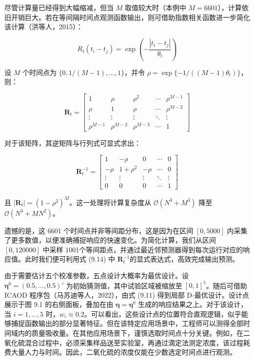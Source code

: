 \documentclass{ctexart}
\begin{document}
尽管计算量已经得到大幅缩减，但当 $M$ 取值较大时（本例中 $M=6601$），计算依旧开销巨大。若在等间隔时间点观测函数输出，则可借助指数相关函数进一步简化该计算（洪等人，2015）：

\begin{equation*}
R_t(t_i-t_j)=\exp\left(-\frac{|t_i-t_j|}{\theta_t}\right)
\end{equation*}

设 $M$ 个时间点为 $\{0,1/(M-1),\dots,1\}$，并令 $\rho=\exp\{-1/((M-1)\theta_t)\}$，则：

\begin{equation*}
\boldsymbol{R}_t=\begin{bmatrix}
1&\rho&\rho^2&\cdots&\rho^{M-1}\\
\rho&1&\rho&\cdots&\rho^{M-2}\\
\vdots&\vdots&\vdots&\ddots&\vdots\\
\rho^{M-1}&\rho^{M-2}&\rho^{M-3}&\cdots&1
\end{bmatrix}
\end{equation*}

对于该矩阵，其逆矩阵与行列式可显式求出：

\begin{equation*}
\boldsymbol{R}_t^{-1}=\begin{bmatrix}
1&-\rho&0&\cdots&0\\
-\rho&1+\rho^2&-\rho&\cdots&0\\
\vdots&\vdots&\vdots&\ddots&\vdots\\
0&0&0&\cdots&1
\end{bmatrix}
\end{equation*}

且 $|\boldsymbol{R}_t|=(1-\rho^2)^M$。这一处理将计算复杂度从 $\mathcal{O}(N^3+M^3)$ 降至 $\mathcal{O}(N^3+MN^2)$。

遗憾的是，这 6601 个时间点并非等间距分布，这是因为在区间 $[0,5000]$ 内采集了更多数值，以便准确捕捉响应的快速变化。为简化计算，我们从区间 $[0,120000]$ 中采样 1001个等间距点，并通过最近邻预测器得到每次运行对应的响应值。此时我们便可利用式 (9.14) 中 $\boldsymbol{R}_t^{-1}$的显式表达式，高效完成输出预测。

由于需要估计五个校准参数，五点设计大概率为最优设计。设 $\boldsymbol{\eta}^0=(0.5,\dots,0.5)'$ 为初始猜测值，其中试验区域被缩放至 $[0,1]^5$。随后可借助 ICAOD 程序包（马苏迪等人，2022），由式 (9.11) 得到局部 D‑最优设计。设计点展示于图 9.1 的右侧面板，叠加在由 $\boldsymbol{\eta}=\boldsymbol{\eta}^0$ 生成的响应结果之上。对于该设计，当 $i=1,\dots,5$ 时，$w_i\approx0.2$。可以看出，这些设计点的位置符合直观逻辑，似乎能够捕捉函数输出的部分显著特征。但在该特定应用场景中，工程师可以测得全部时间域内的质量吸收量。在其他应用场景下，谨慎选取时间点十分关键。例如，在二氧化硫混合过程中，必须采集样品送至实验室，再通过滴定法测定浓度，该过程耗费大量人力与时间。因此，二氧化硫的浓度仅能在少数选定时间点进行观测。
\end{document}
